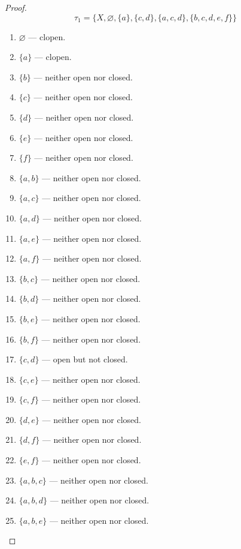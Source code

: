 \begin{proof}
    \[
        \tau_{1} = \{ X, \varnothing, \{ a \}, \{ c, d \}, \{ a, c, d \}, \{ b, c, d, e, f \} \}
    \]
    \begin{enumerate}[label={(\arabic*)}]
        \item $\varnothing$ --- clopen.
        \item $\{ a \}$ --- clopen.
        \item $\{ b \}$ --- neither open nor closed.
        \item $\{ c \}$ --- neither open nor closed.
        \item $\{ d \}$ --- neither open nor closed.
        \item $\{ e \}$ --- neither open nor closed.
        \item $\{ f \}$ --- neither open nor closed.
        \item $\{ a, b \}$ --- neither open nor closed.
        \item $\{ a, c \}$ --- neither open nor closed.
        \item $\{ a, d \}$ --- neither open nor closed.
        \item $\{ a, e \}$ --- neither open nor closed.
        \item $\{ a, f \}$ --- neither open nor closed.
        \item $\{ b, c \}$ --- neither open nor closed.
        \item $\{ b, d \}$ --- neither open nor closed.
        \item $\{ b, e \}$ --- neither open nor closed.
        \item $\{ b, f \}$ --- neither open nor closed.
        \item $\{ c, d \}$ --- open but not closed.
        \item $\{ c, e \}$ --- neither open nor closed.
        \item $\{ c, f \}$ --- neither open nor closed.
        \item $\{ d, e \}$ --- neither open nor closed.
        \item $\{ d, f \}$ --- neither open nor closed.
        \item $\{ e, f \}$ --- neither open nor closed.
        \item $\{ a, b, c \}$ --- neither open nor closed.
        \item $\{ a, b, d \}$ --- neither open nor closed.
        \item $\{ a, b, e \}$ --- neither open nor closed.

\end{enumerate}
\end{proof}
